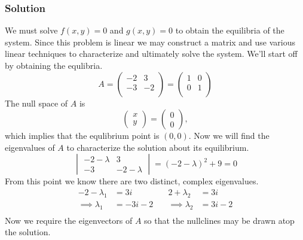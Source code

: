 \documentclass[12pt]{article}
\begin{document}
\subsubsection*{Solution}
We must solve $f(x,y)=0$ and $g(x,y)=0$ to obtain the equilibria of the system.
Since this problem is linear we may construct a matrix and use various linear
techniques to characterize and ultimately solve the system. We'll start off by
obtaining the equlibria.
\begin{equation*}
  A = \begin{pmatrix}-2&3\\-3&-2\\\end{pmatrix}
  = \begin{pmatrix}1&0\\0&1\\\end{pmatrix}
\end{equation*}
The null space of $A$ is
$$\begin{pmatrix}x\\y\end{pmatrix} = \begin{pmatrix}0\\0\end{pmatrix},$$ which
implies that the equlibrium point is $(0,0)$. Now we will find the eigenvalues of
$A$ to characterize the solution about its equilibrium.
\begin{equation*}
  \begin{vmatrix}-2-\lambda&3\\-3&-2-\lambda\end{vmatrix} = {(-2-\lambda)}^2 + 9 = 0
\end{equation*}
From this point we know there are two distinct, complex eigenvalues.
\begin{equation*}
  \begin{aligned}
    -2-\lambda_1&=3i &\quad 2+\lambda_2&=3i \\
    \implies\lambda_1 &=-3i-2 &\quad \implies\lambda_2 &= 3i-2 \\
  \end{aligned}
\end{equation*}
Now we require the eigenvectors of $A$ so that the nullclines may be drawn atop
the solution.
\end{document}

